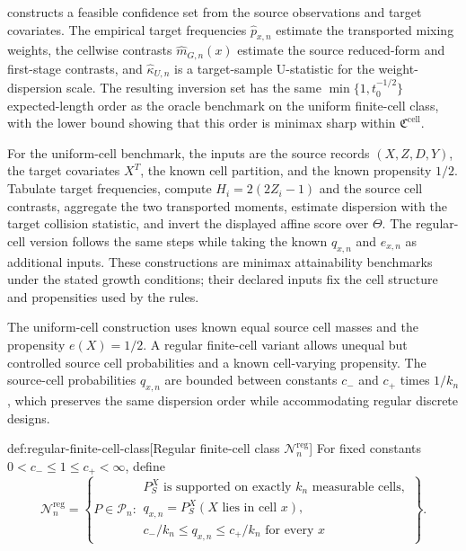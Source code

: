 constructs a feasible confidence set from the source observations and target covariates.  The empirical target frequencies \(\widehat p_{x,n}\) estimate the transported mixing weights, the cellwise contrasts \(\widehat m_{G,n}(x)\) estimate the source reduced-form and first-stage contrasts, and \(\widehat\kappa_{U,n}\) is a target-sample U-statistic for the weight-dispersion scale.  The resulting inversion set has the same \(\min\{1,t_0^{-1/2}\}\) expected-length order as the oracle benchmark on the uniform finite-cell class, with the lower bound showing that this order is minimax sharp within \(\mathfrak C^{\mathrm{cell}}\).

For the uniform-cell benchmark, the inputs are the source records \((X,Z,D,Y)\), the target covariates \(X^T\), the known cell partition, and the known propensity \(1/2\). Tabulate target frequencies, compute \(H_i=2(2Z_i-1)\) and the source cell contrasts, aggregate the two transported moments, estimate dispersion with the target collision statistic, and invert the displayed affine score over \(\Theta\). The regular-cell version follows the same steps while taking the known \(q_{x,n}\) and \(e_{x,n}\) as additional inputs. These constructions are minimax attainability benchmarks under the stated growth conditions; their declared inputs fix the cell structure and propensities used by the rules.

The uniform-cell construction uses known equal source cell masses and the propensity \(e(X)=1/2\).  A regular finite-cell variant allows unequal but controlled source cell probabilities and a known cell-varying propensity.  The source-cell probabilities \(q_{x,n}\) are bounded between constants \(c_-\) and \(c_+\) times \(1/k_n\), which preserves the same dispersion order while accommodating regular discrete designs.

\begin{definitionv}{def:regular-finite-cell-class}[Regular finite-cell class $\mathcal N_n^{\mathrm{reg}}$]
For fixed constants \(0<c_-\le 1\le c_+<\infty\), define
\[
\mathcal N_n^{\mathrm{reg}}
=
\left\{
P\in\mathcal P_n:
\begin{array}{l}
P_S^X \text{ is supported on exactly } k_n \text{ measurable cells},\\
q_{x,n}=P_S^X(X \text{ lies in cell } x),\\
c_-/k_n\le q_{x,n}\le c_+/k_n \text{ for every } x
\end{array}
\right\}.
\]
\end{definitionv}


